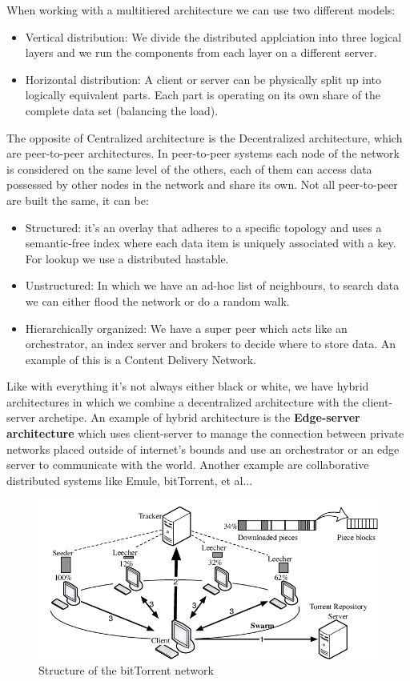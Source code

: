 When working with a multitiered architecture we can use two different models:
\begin{itemize}
    \item Vertical distribution: We divide the distributed applciation into three logical layers and we run the components from each layer on a different server.
    \item Horizontal distribution: A client or server can be physically split up into logically equivalent parts. Each part is operating on its own share of the complete data set (balancing the load).
\end{itemize}
The opposite of Centralized architecture is the Decentralized architecture, which are peer-to-peer architectures. \n
In peer-to-peer systems each node of the network is considered on the same level of the others, each of them can access data possessed by other nodes in the network and share its own. Not all peer-to-peer are built the same, it can be:
\begin{itemize}
    \item Structured: it's an overlay that adheres to a specific topology and uses a semantic-free index where each data item is uniquely associated with a key. For lookup we use a distributed hastable.
    \item Unstructured: In which we have an ad-hoc list of neighbours, to search data we can either flood the network or do a random walk.
    \item Hierarchically organized: We have a super peer which acts like an orchestrator, an index server and brokers to decide where to store data. An example of this is a Content Delivery Network.
\end{itemize}
Like with everything it's not always either black or white, we have hybrid architectures in which we combine a decentralized architecture with the client-server archetipe. \n
An example of hybrid architecture is the \textbf{Edge-server architecture} which uses client-server to manage the connection between private networks placed outside of internet's bounds and use an orchestrator or an edge server to communicate with the world. \n
Another example are collaborative distributed systems like Emule, bitTorrent, et al...
\begin{figure}[htb]
    \centering
    \includegraphics[scale=0.45]{./Images/bittorrent.png}
    \caption{Structure of the bitTorrent network}
\end{figure}
